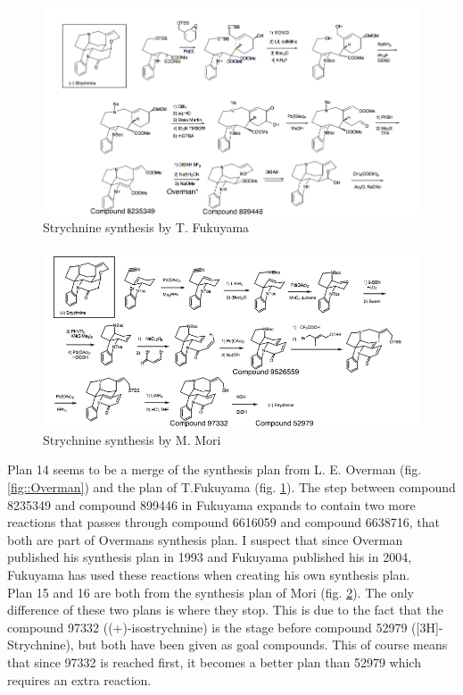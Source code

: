 \documentclass[a4paper,10pt,titlepage]{paper}
\begin{document}
\begin{figure}
\centering
\includegraphics[scale=0.5, angle=90]{Synteseplaner/Strychnine/Fukuyama.png}
\caption{Strychnine synthesis by T. Fukuyama \cite{SynthesisPlans}}
\label{fig::Fukuyama}
\end{figure}

\begin{figure}
\centering
\includegraphics[scale=0.5, angle=90]{Synteseplaner/Strychnine/Mori.png}
\caption{Strychnine synthesis by M. Mori \cite{SynthesisPlans}}
\label{fig::Mori}
\end{figure}
Plan 14 seems to be a merge of the synthesis plan from L. E. Overman (fig. \ref{fig::Overman}) and the plan of T.Fukuyama (fig. \ref{fig::Fukuyama}). The step between compound 8235349 and compound 899446 in Fukuyama expands to contain two more reactions that passes through compound 6616059 and compound 6638716, that both are part of Overmans synthesis plan. I suspect that since Overman published his synthesis plan in 1993 and Fukuyama published his in 2004, Fukuyama has used these reactions when creating his own synthesis plan.\\

Plan 15 and 16 are both from the synthesis plan of Mori (fig. \ref{fig::Mori}). The only difference of these two plans is where they stop. This is due to the fact that the compound 97332 ((+)-isostrychnine) is the stage before compound 52979 ([3H]-Strychnine), but both have been given as goal compounds. This of course means that since 97332 is reached first, it becomes a better plan than 52979 which requires an extra reaction.\\
\end{document}

